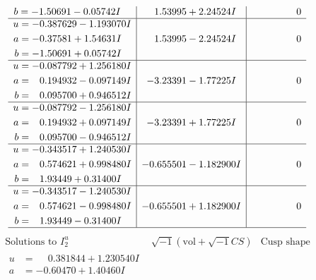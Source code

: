 \documentclass[1p]{elsarticle_modified}
\theoremstyle{definition}
\newcommand{\I}{\sqrt{-1}}
\begin{document}
$$\begin{array}{c|c|c}
\begin{aligned}
b &= -1.50691 - 0.05742 I\end{aligned}
 & \phantom{-}1.53995 + 2.24524 I & \phantom{-0.000000 } 0 \\ \hline\begin{aligned}
u &= -0.387629 - 1.193070 I \\
a &= -0.37581 + 1.54631 I \\
b &= -1.50691 + 0.05742 I\end{aligned}
 & \phantom{-}1.53995 - 2.24524 I & \phantom{-0.000000 } 0 \\ \hline\begin{aligned}
u &= -0.087792 + 1.256180 I \\
a &= \phantom{-}0.194932 - 0.097149 I \\
b &= \phantom{-}0.095700 + 0.946512 I\end{aligned}
 & -3.23391 - 1.77225 I & \phantom{-0.000000 } 0 \\ \hline\begin{aligned}
u &= -0.087792 - 1.256180 I \\
a &= \phantom{-}0.194932 + 0.097149 I \\
b &= \phantom{-}0.095700 - 0.946512 I\end{aligned}
 & -3.23391 + 1.77225 I & \phantom{-0.000000 } 0 \\ \hline\begin{aligned}
u &= -0.343517 + 1.240530 I \\
a &= \phantom{-}0.574621 + 0.998480 I \\
b &= \phantom{-}1.93449 + 0.31400 I\end{aligned}
 & -0.655501 - 1.182900 I & \phantom{-0.000000 } 0 \\ \hline\begin{aligned}
u &= -0.343517 - 1.240530 I \\
a &= \phantom{-}0.574621 - 0.998480 I \\
b &= \phantom{-}1.93449 - 0.31400 I\end{aligned}
 & -0.655501 + 1.182900 I & \phantom{-0.000000 } 0\\
 \hline 
 \end{array}$$\newpage$$\begin{array}{c|c|c}  
\text{Solutions to }I^u_{2}& \I (\text{vol} + \sqrt{-1}CS) & \text{Cusp shape}\\
 \hline 
\begin{aligned}
u &= \phantom{-}0.381844 + 1.230540 I \\
a &= -0.60470 + 1.40460 I \\

\end{aligned}
\end{array}$$
\end{document}
